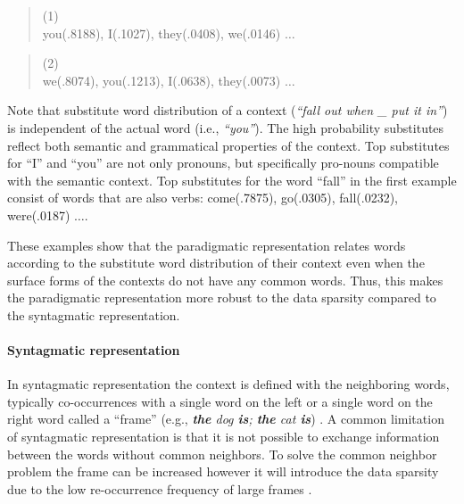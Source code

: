 \begin{quote}
  \small
  (1) \\
   you(.8188), I(.1027), they(.0408), we(.0146) $\ldots$
\end{quote}

\begin{quote}
  \small
  (2) \\
   we(.8074), you(.1213), I(.0638), they(.0073) $\ldots$
\end{quote}

Note that substitute word distribution of a context ({\it ``fall out when \_
put it in''}) is independent of the actual word (i.e., {\it ``you''}).  The
high probability substitutes reflect both semantic and grammatical properties
of the context.  Top substitutes for ``I'' and ``you'' are not only pronouns,
but specifically pro-nouns compatible with the semantic context.  Top
substitutes for the word ``fall'' in the first example consist of words that
are also verbs: come(.7875), go(.0305), fall(.0232), were(.0187) $\ldots$.

These examples show that the paradigmatic representation relates words according
to the substitute word distribution of their context even when the surface
forms of the contexts do not have any common words.  Thus, this makes the
paradigmatic representation more robust to the data sparsity compared to the
syntagmatic representation.



\paragraph {Syntagmatic representation} 
In syntagmatic representation the context is defined with the neighboring
words, typically co-occurrences with a single word on the left or a single word
on the right word called a ``frame'' (e.g., {\em {\bf the} dog {\bf is}; {\bf
the} cat {\bf is}})
\citep*{SchutzePe93,Redington98distributionalinformation, Mintz200391,clair2010,lamar-EtAl:2010:Short,maron2010sphere}. A common limitation of syntagmatic representation is that
it is not possible to exchange information between the words without common
neighbors.  To solve the common neighbor problem the frame can be increased
however it will introduce the data sparsity due to the low re-occurrence
frequency of large frames \citep*{manning99foundations}.

